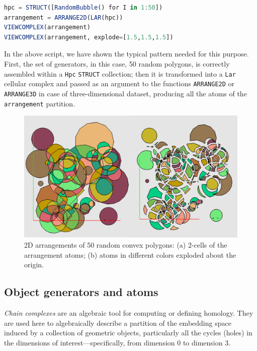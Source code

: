 \documentclass{juliacon}
\begin{document}
\begin{lstlisting}[language = Julia,numbers=none,label={lst:exmpl10},
caption={aaaa.}
]
hpc = STRUCT([RandomBubble() for I in 1:50])
arrangement = ARRANGE2D(LAR(hpc))
VIEWCOMPLEX(arrangement)
VIEWCOMPLEX(arrangement, explode=[1.5,1.5,1.5])
\end{lstlisting}
	In the above script, we have shown the typical pattern needed for this purpose. First, the set of generators, in this case, 50 random polygons, is correctly assembled within a {\tt Hpc}
	{\tt STRUCT} collection; then it is transformed into a {\tt Lar} cellular complex and passed as an argument to the functions {\tt ARRANGE2D} or {\tt ARRANGE3D} in case of three-dimensional dataset, producing all the atoms of the {\tt arrangement} partition. 
\begin{figure}[htbp]  \centering
	\includegraphics[width=\linewidth]{figs/bubbles}
	\caption{2D arrangements of 50 random convex polygons: (a) 2-cells of the arrangement atoms; (b) atoms in different colors exploded about the origin.}
	\label{fig:6:4:arrange3d}
\end{figure}

	

\subsection{Object generators and atoms}
\label{subsec:title_auth}

\emph{Chain complexes} are an algebraic tool for computing or defining homology. They are used here to algebraically describe a partition of the embedding space induced by a collection of geometric objects, particularly all the cycles (holes) in the dimensions of interest—specifically, from dimension 0 to dimension 3. 
\end{document}

